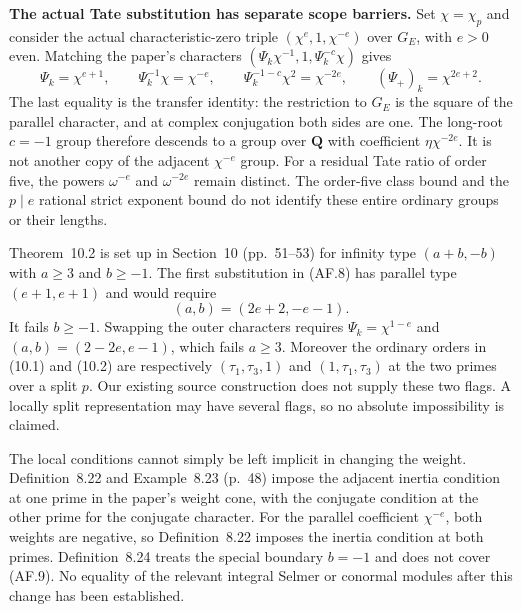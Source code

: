 \documentclass[11pt,a4paper]{article}
\theoremstyle{definition}
\renewcommand{\paragraph}[1]{\par\smallskip\noindent\textbf{#1}\quad\ignorespaces}
\begin{document}
\paragraph{The actual Tate substitution has separate scope barriers.}
Set $\chi=\chi_p$ and consider the actual characteristic-zero
triple $(\chi^e,1,\chi^{-e})$ over $G_E$, with $e>0$ even.
Matching the paper's characters
$(\Psi_k\chi^{-1},1,\Psi_k^{-c}\chi)$ gives
\[
 \Psi_k=\chi^{e+1},\qquad
 \Psi_k^{-1}\chi=\chi^{-e},\qquad
 \Psi_k^{-1-c}\chi^2=\chi^{-2e},\qquad
 (\Psi_+)_k=\chi^{2e+2}.                                    \tag{AF.8}
\]
The last equality is the transfer identity: the restriction to $G_E$
is the square of the parallel character, and at complex conjugation
both sides are one.  The long-root $c=-1$ group therefore descends
to a group over $\mathbf Q$ with coefficient
$\eta\chi^{-2e}$.  It is not another copy of the adjacent
$\chi^{-e}$ group.  For a residual Tate ratio of order five,
the powers $\omega^{-e}$ and $\omega^{-2e}$ remain distinct.
The order-five class bound and the $p\mid e$ rational strict exponent
bound do not identify these entire ordinary groups or their lengths.

Theorem~10.2 is set up in Section~10 (pp.~51--53) for infinity type
$(a+b,-b)$ with $a\geq3$ and $b\geq-1$.  The first substitution
in (AF.8) has parallel type $(e+1,e+1)$ and would require
\[
 (a,b)=(2e+2,-e-1).
                                                               \tag{AF.9}
\]
It fails $b\geq-1$.  Swapping the outer characters requires
$\Psi_k=\chi^{1-e}$ and $(a,b)=(2-2e,e-1)$, which fails
$a\geq3$.  Moreover the ordinary orders in (10.1) and (10.2)
are respectively $(\tau_1,\tau_3,1)$ and $(1,\tau_1,\tau_3)$
at the two primes over a split $p$.  Our existing source construction
does not supply these two flags.  A locally split representation may
have several flags, so no absolute impossibility is claimed.

The local conditions cannot simply be left implicit in changing the
weight.  Definition~8.22 and Example~8.23 (p.~48) impose the adjacent
inertia condition at one prime in the paper's weight cone, with the
conjugate condition at the other prime for the conjugate character.
For the parallel coefficient $\chi^{-e}$, both weights are negative,
so Definition~8.22 imposes the inertia condition at both primes.
Definition~8.24 treats the special boundary $b=-1$ and does not cover
(AF.9).  No equality of the relevant integral Selmer or conormal
modules after this change has been established.
\end{document}
